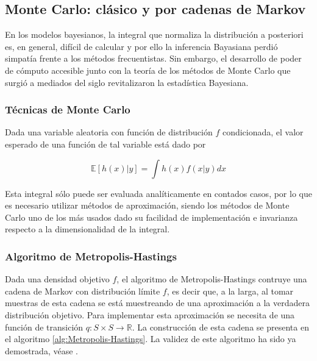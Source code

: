 \subsection{Monte Carlo: clásico y por cadenas de Markov}

En los modelos bayesianos, la integral que normaliza la distribución a posteriori 
es, en general, difícil de calcular y por ello la inferencia Bayasiana perdió
simpatía frente a los métodos frecuentistas. Sin embargo, el desarrollo de poder de cómputo
accesible junto con la teoría de los métodos de Monte Carlo que surgió a mediados del 
siglo revitalizaron la estadística Bayesiana. 

\subsubsection{Técnicas de Monte Carlo}

Dada una variable aleatoria con función de distribución $f$ condicionada, el valor 
esperado de una función de tal variable está dado por

\begin{equation}
    \mathbb E\left[h(x)|y\right]=\int h(x)f(x|y)dx
\end{equation} 

Esta integral sólo puede ser evaluada analíticamente en contados casos, por lo que es 
necesario utilizar métodos de aproximación, siendo los métodos de Monte Carlo uno de 
los más usados dado su facilidad de implementación e invarianza respecto a la 
dimensionalidad de la integral. 

\subsubsection{Algoritmo de Metropolis-Hastings}

Dada una densidad objetivo $f$, el algoritmo de Metropolis-Hastings contruye una 
cadena de Markov con distribución límite $f$, es decir que, a la larga, al tomar 
muestras de esta cadena se está muestreando de una aproximación a la verdadera
distribución objetivo. Para implementar esta aproximación se necesita de una 
función de transición $q:S\times S\to \mathbb R$. La construcción de esta 
cadena se presenta en el algoritmo \ref{alg:Metropolis-Hastings}. La validez de este 
algoritmo ha sido ya demostrada, véase \cite{rinconElementosSimulacionEstocastica2024}. 

